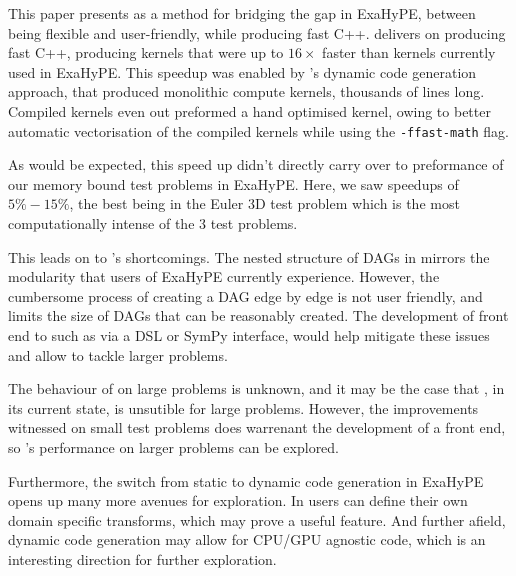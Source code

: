 This paper presents \phlat as a method for bridging the gap in ExaHyPE, between being flexible and user-friendly, while producing fast C++.
\phlat delivers on producing fast C++, producing kernels that were up to $16\times$ faster than kernels currently used in ExaHyPE.
This speedup was enabled by \phlat{}'s dynamic code generation approach, that produced monolithic compute kernels, thousands of lines long.
Compiled kernels even out preformed a hand optimised kernel, owing to better automatic vectorisation of the compiled kernels while using the \texttt{-ffast-math} flag.

As would be expected, this speed up didn't directly carry over to preformance of our memory bound test problems in ExaHyPE.
Here, we saw speedups of $5\% - 15\%$, the best being in the Euler 3D test problem which is the most computationally intense of the 3 test problems.

This leads on to \phlat{}'s shortcomings.
The nested structure of DAGs in \phlat mirrors the modularity that users of ExaHyPE currently experience.
However, the cumbersome process of creating a DAG edge by edge is not user friendly, and limits the size of DAGs that can be reasonably created.
The development of front end to \phlat such as via a DSL or SymPy interface, would help mitigate these issues and allow \phlat to tackle larger problems.

The behaviour of \phlat on large problems is unknown, and it may be the case that \phlat, in its current state, is unsutible for large problems.
However, the improvements witnessed on small test problems does warrenant the development of a front end, so \phlat{}'s performance on larger problems can be explored.

Furthermore, the switch from static to dynamic code generation in ExaHyPE opens up many more avenues for exploration.
In \phlat users can define their own domain specific transforms, which may prove a useful feature.
And further afield, dynamic code generation may allow for CPU/GPU agnostic code, which is an interesting direction for further exploration.

